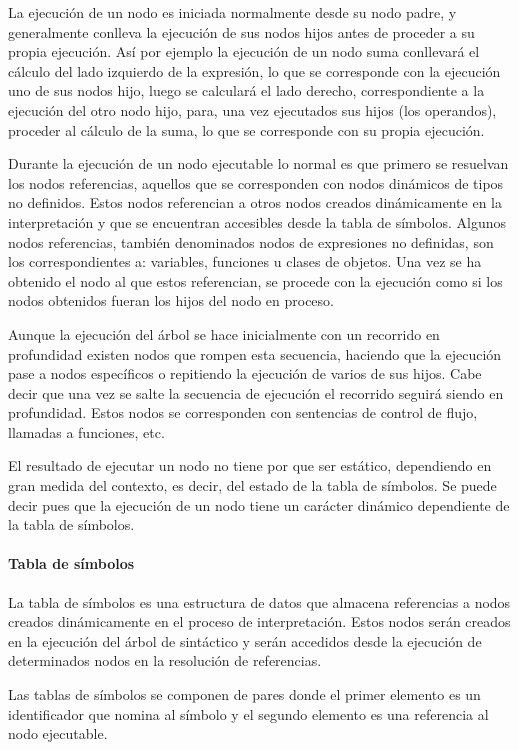 La ejecución de un nodo es iniciada normalmente desde su nodo padre, y generalmente conlleva la ejecución de sus nodos hijos antes de proceder a su propia ejecución. Así por ejemplo 
la ejecución de un nodo suma conllevará el cálculo del lado izquierdo de la expresión, lo que se corresponde con la ejecución uno de sus nodos hijo, luego se calculará
el lado derecho, correspondiente a la ejecución del otro nodo hijo, para, una vez ejecutados sus hijos (los operandos), proceder al cálculo de la suma, lo que se corresponde 
con su propia ejecución. 

Durante la ejecución de un nodo ejecutable lo normal es que primero se resuelvan los nodos referencias, aquellos que se corresponden con nodos dinámicos de tipos no definidos. Estos 
nodos referencian a otros nodos creados dinámicamente en la interpretación y que se encuentran accesibles desde la tabla de símbolos. Algunos nodos referencias, 
también denominados nodos de expresiones no definidas, son los correspondientes a: variables, funciones u clases de objetos. Una vez se ha obtenido el nodo al que estos referencian, 
se procede con la ejecución como si los nodos obtenidos fueran los hijos del nodo en proceso.

Aunque la ejecución del árbol se hace inicialmente con un recorrido en profundidad existen nodos que rompen esta secuencia, haciendo que la ejecución pase a nodos específicos 
o repitiendo la ejecución de varios de sus hijos. Cabe decir que una vez se salte la secuencia de ejecución el recorrido seguirá siendo en profundidad. Estos nodos 
se corresponden con sentencias de control de flujo, llamadas a funciones, etc.

El resultado de ejecutar un nodo no tiene por que ser estático, dependiendo en gran medida del contexto, es decir, del estado de la tabla de símbolos. Se puede decir pues que la 
ejecución de un nodo tiene un carácter dinámico dependiente de la tabla de símbolos.

\paragraph{Tabla de símbolos}
La tabla de símbolos es una estructura de datos que almacena referencias a nodos creados dinámicamente en el proceso de interpretación. Estos nodos serán creados en la 
ejecución del árbol de sintáctico y serán accedidos desde la ejecución de determinados nodos en la resolución de referencias. 

Las tablas de símbolos se componen de pares donde el primer elemento es un identificador que nomina al símbolo y el segundo elemento es una referencia al nodo ejecutable. 

